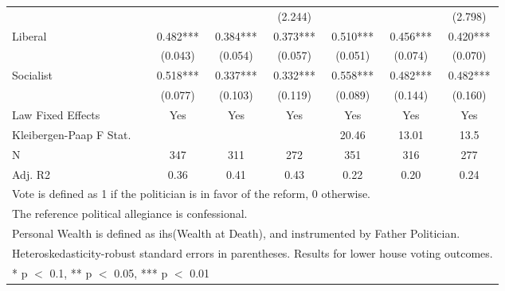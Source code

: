 \begin{table}[!h]
{\begin{tabular}[t]{lcccccc}
 &  &  & (\num{2.244}) &  &  & (\num{2.798})\\
Liberal & \num{0.482}*** & \num{0.384}*** & \num{0.373}*** & \num{0.510}*** & \num{0.456}*** & \num{0.420}***\\
 & (\num{0.043}) & (\num{0.054}) & (\num{0.057}) & (\num{0.051}) & (\num{0.074}) & (\num{0.070})\\
Socialist & \num{0.518}*** & \num{0.337}*** & \num{0.332}*** & \num{0.558}*** & \num{0.482}*** & \num{0.482}***\\
 & (\num{0.077}) & (\num{0.103}) & (\num{0.119}) & (\num{0.089}) & (\num{0.144}) & (\num{0.160})\\
\midrule
Law Fixed Effects & Yes & Yes & Yes & Yes & Yes & Yes\\
Kleibergen-Paap F Stat. &  &  &  & 20.46 & 13.01 & 13.5\\
N & \num{347} & \num{311} & \num{272} & \num{351} & \num{316} & \num{277}\\
Adj. R2 & \num{0.36} & \num{0.41} & \num{0.43} & \num{0.22} & \num{0.20} & \num{0.24}\\
\bottomrule
\multicolumn{7}{l}{\rule{0pt}{1em}Vote is defined as 1 if the politician is in favor of the reform, 0 otherwise.}\\
\multicolumn{7}{l}{\rule{0pt}{1em}The reference political allegiance is confessional.}\\
\multicolumn{7}{l}{\rule{0pt}{1em}Personal Wealth is defined as ihs(Wealth at Death), and instrumented by Father Politician.}\\
\multicolumn{7}{l}{\rule{0pt}{1em}Heteroskedasticity-robust standard errors in parentheses. Results for lower house voting outcomes.}\\
\multicolumn{7}{l}{\rule{0pt}{1em}* p $<$ 0.1, ** p $<$ 0.05, *** p $<$ 0.01}\\
\end{tabular}}
\end{table}